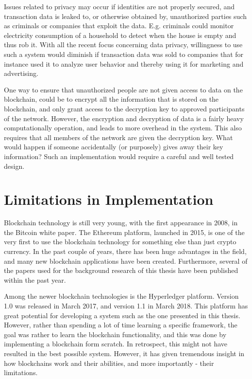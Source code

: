 Issues related to privacy may occur if identities are not properly secured, and transaction data is leaked to, or otherwise obtained by, unauthorized parties such as criminals or companies that exploit the data. E.g. criminals could monitor electricity consumption of a household to detect when the house is empty and thus rob it. With all the recent focus concerning data privacy, willingness to use such a system would diminish if transaction data was sold to companies that for instance used it to analyze user behavior and thereby using it for marketing and advertising.

One way to ensure that unauthorized people are not given access to data on the blockchain, could be to encrypt all the information that is stored on the blockchain, and only grant access to the decryption key to approved participants of the network. However, the encryption and decryption of data is a fairly heavy computationally operation, and leads to more overhead in the system. This also requires that all members of the network are given the decryption key. What would happen if someone accidentally (or purposely) gives away their key information? Such an implementation would require a careful and well tested design. 



\section{Limitations in Implementation}\label{limit}
Blockchain technology is still very young, with the first appearance in 2008, in the Bitcoin white paper. The Ethereum platform, launched in 2015, is one of the very first to use the blockchain technology for something else than just crypto currency. In the past couple of years, there has been huge advantages in the field, and many new blockchain applications have been created. Furthermore, several of the papers used for the background research of this thesis have been published within the past year. 

Among the newer blockchain technologies is the Hyperledger platform. Version 1.0 was released in March 2017, and version 1.1 in March 2018. This platform has great potential for developing a system such as the one presented in this thesis. However, rather than spending a lot of time learning a specific framework, the goal was rather to learn the blockchain functionality, and this was done by implementing a blockchain form scratch. In retrospect, this might not have resulted in the best possible system. However, it has given tremendous insight in how blockchains work and their abilities, and more importantly - their limitations.


